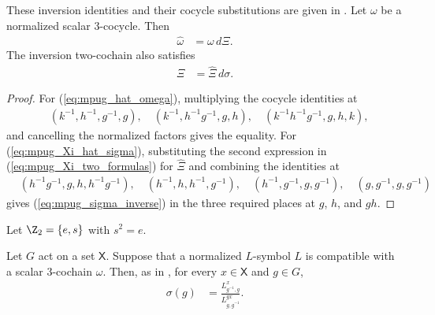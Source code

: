 \begin{lemma}
    \label{thm:mpug_omega_Xi}
    \leanok
    These inversion identities and their cocycle substitutions are given in
    \cite[lines~5967--5979]{FrancoRubio2025MPUGauging}.
    Let $\omega$ be a normalized scalar $3$-cocycle. Then
    \begin{align}
        \widehat\omega & =\omega\,d\Xi.
        \label{eq:mpug_hat_omega}
    \end{align}
    The inversion two-cochain also satisfies
    \begin{align}
        \Xi & =\widehat\Xi\,d\sigma.
        \label{eq:mpug_Xi_hat_sigma}
    \end{align}
\end{lemma}

\begin{proof}\leanok
    For (\ref{eq:mpug_hat_omega}), multiplying the cocycle identities at
    \begin{align}
         & (k^{-1},h^{-1},g^{-1},g),\quad
        (k^{-1},h^{-1}g^{-1},g,h),\quad
        (k^{-1}h^{-1}g^{-1},g,h,k),
    \end{align}
    and cancelling the normalized factors gives the equality. For
    (\ref{eq:mpug_Xi_hat_sigma}), substituting the second expression in
    (\ref{eq:mpug_Xi_two_formulas}) for $\widehat\Xi$ and combining the
    identities at
    \begin{align}
         & (h^{-1}g^{-1},g,h,h^{-1}g^{-1}),\quad
        (h^{-1},h,h^{-1},g^{-1}),\quad
        (h^{-1},g^{-1},g,g^{-1}),\quad
        (g,g^{-1},g,g^{-1})
    \end{align}
    gives (\ref{eq:mpug_sigma_inverse}) in the three required places at $g$,
    $h$, and $gh$.
\end{proof}

Let $\Z_2=\{e,s\}$ with $s^2=e$.

\begin{lemma}
    \label{thm:mpug_sigma_l_ratio}
    \leanok
    Let $G$ act on a set $\mathsf X$. Suppose that a normalized $L$-symbol
    $L$ is compatible with a scalar $3$-cochain $\omega$. Then, as in
    \cite[lines~5327--5329]{FrancoRubio2025MPUGauging}, for every
    $x\in\mathsf X$ and $g\in G$,
    \begin{align}
        \sigma(g)
         & =\frac{L^x_{g^{-1},g}}{L^{g x}_{g,g^{-1}}}.
        \label{eq:mpug_sigma_l_ratio}
    \end{align}
\end{lemma}

